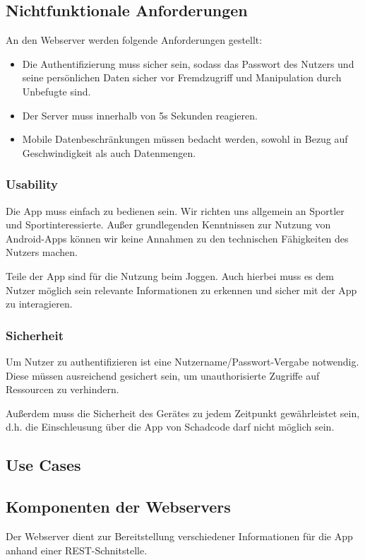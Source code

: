 \subsection{Nichtfunktionale Anforderungen}
An den Webserver werden folgende Anforderungen gestellt:
\begin{itemize}
\item Die Authentifizierung muss sicher sein, sodass das Passwort des Nutzers und seine persönlichen Daten sicher vor Fremdzugriff und Manipulation durch Unbefugte sind.
\item Der Server muss innerhalb von 5s Sekunden reagieren.
\item Mobile Datenbeschränkungen müssen bedacht werden, sowohl in Bezug auf Geschwindigkeit als auch Datenmengen.
\end{itemize}
\subsubsection{Usability}
Die App muss einfach zu bedienen sein. Wir richten uns allgemein an Sportler und Sportinteressierte. Außer grundlegenden Kenntnissen zur Nutzung von Android-Apps können wir keine Annahmen zu den technischen Fähigkeiten des Nutzers machen.

Teile der App sind für die Nutzung beim Joggen. Auch hierbei muss es dem Nutzer möglich sein relevante Informationen zu erkennen und sicher mit der App zu interagieren.

\subsubsection{Sicherheit}
Um Nutzer zu authentifizieren ist eine Nutzername/Passwort-Vergabe notwendig. Diese müssen ausreichend gesichert sein, um unauthorisierte Zugriffe auf Ressourcen zu verhindern. 

Außerdem muss die Sicherheit des Gerätes zu jedem Zeitpunkt gewährleistet sein, d.h. die Einschleusung über die App von Schadcode darf nicht möglich sein.

\subsection{Use Cases}
\subsection{Komponenten der Webservers}
Der Webserver dient zur Bereitstellung verschiedener Informationen für die App anhand einer REST-Schnitstelle. 


